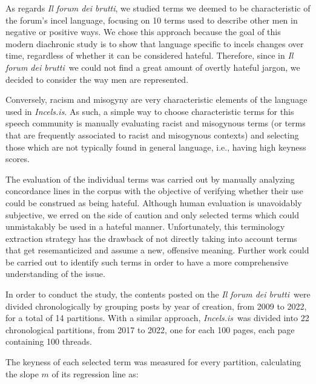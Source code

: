\documentclass[11pt]{article}
\newcommand{\enforum}{\textit{Incels.is}}
\newcommand{\itforum}{\textit{Il forum dei brutti}}
\begin{document}
As regards \itforum, we studied terms we deemed to be characteristic of the forum's incel language, focusing on 10 terms used to describe other men in negative or positive ways. We chose this approach because the goal of this modern diachronic study is to show that language specific to incels changes over time, regardless of whether it can be considered hateful. Therefore, since in \itforum\, we could not find a great amount of overtly hateful jargon, we decided to consider the way men are represented.

Conversely, racism and misogyny are very characteristic elements of the language used in \enforum. As such, a simple way to choose characteristic terms for this speech community is manually evaluating racist and misogynous terms (or terms that are frequently associated to racist and misogynous contexts) and selecting those which are not typically found in general language, i.e., having high keyness scores.

The evaluation of the individual terms was carried out by manually analyzing concordance lines in the corpus with the objective of verifying whether their use could be construed as being hateful. Although human evaluation is unavoidably subjective, we erred on the side of caution and only selected terms which could unmistakably be used in a hateful manner. Unfortunately, this terminology extraction strategy has the drawback of not directly taking into account terms that get resemanticized and assume a new, offensive meaning. Further work could be carried out to identify such terms in order to have a more comprehensive understanding of the issue.

In order to conduct the study, the contents posted on the \itforum\, were divided chronologically by grouping posts by year of creation, from 2009 to 2022, for a total of 14 partitions. With a similar approach, \enforum\, was divided into 22 chronological partitions, from 2017 to 2022, one for each 100 pages, each page containing 100 threads.

The keyness of each selected term was measured for every partition, calculating the slope $m$ of its regression line as:
\end{document}
